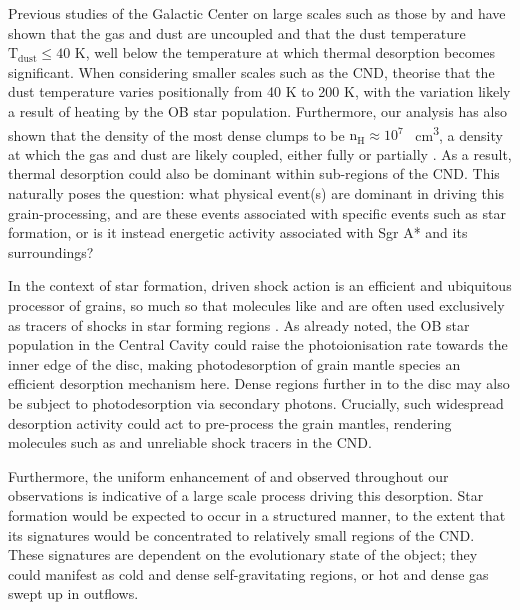 \documentclass[twocolumn]{aastex631}
\begin{document}
Previous studies of the Galactic Center on large scales such as those by \citet{galCenDustTemp} and \citet{galacticCenterCosmicRays} have shown that the gas and dust are uncoupled and that the dust temperature $\mathrm{T_{dust}} \leq 40$ \si{\kelvin}, well below the temperature at which thermal desorption becomes significant. When considering smaller scales such as the CND, \citet{galCenKuiper} theorise that the dust temperature varies positionally from 40 \si{\kelvin} to 200 \si{\kelvin}, with the variation likely a result of heating by the OB star population. Furthermore, our analysis has also shown that the density of the most dense clumps to be $\mathrm{n_{H}} \approx 10^{7}$ \si{\per\centi\meter\cubed}, a density at which the gas and dust are likely coupled, either fully or partially \citep{depletionThermalCoupling}. As a result, thermal desorption could also be dominant within sub-regions of the CND. This naturally poses the question: what physical event(s) are dominant in driving this grain-processing, and are these events associated with specific events such as star formation, or is it instead energetic activity associated with Sgr A* and its surroundings?  

In the context of star formation, driven shock action is an efficient and ubiquitous processor of grains, so much so that molecules like  and  are often used exclusively as tracers of shocks in star forming regions \citep{SiOShockTracer, sulphurShockTracer}. As already noted, the OB star population in the Central Cavity could raise the photoionisation rate towards the inner edge of the disc, making photodesorption of grain mantle species an efficient desorption mechanism here. Dense regions further in to the disc may also be subject to photodesorption via secondary photons. Crucially, such widespread desorption activity could act to pre-process the grain mantles, rendering molecules such as  and  unreliable shock tracers in the CND. 

Furthermore, the uniform enhancement of  and  observed throughout our observations is indicative of a large scale process driving this desorption. Star formation would be expected to occur in a structured manner, to the extent that its signatures would be concentrated to relatively small regions of the CND. These signatures are dependent on the evolutionary state of the object; they could manifest as cold and dense self-gravitating regions, or hot and dense gas swept up in outflows. 
\end{document}
